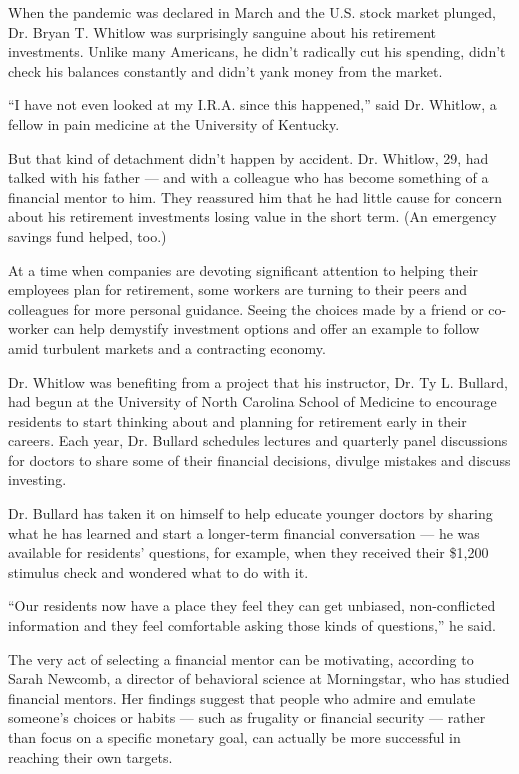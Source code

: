 When the pandemic was declared in March and the U.S. stock market
plunged, Dr. Bryan T. Whitlow was surprisingly sanguine about his
retirement investments. Unlike many Americans, he didn't radically cut
his spending, didn't check his balances constantly and didn't yank money
from the market.

``I have not even looked at my I.R.A. since this happened,'' said Dr.
Whitlow, a fellow in pain medicine at the University of Kentucky.

But that kind of detachment didn't happen by accident. Dr. Whitlow, 29,
had talked with his father --- and with a colleague who has become
something of a financial mentor to him. They reassured him that he had
little cause for concern about his retirement investments losing value
in the short term. (An emergency savings fund helped, too.)

At a time when companies are devoting significant attention to helping
their employees plan for retirement, some workers are turning to their
peers and colleagues for more personal guidance. Seeing the choices made
by a friend or co-worker can help demystify investment options and offer
an example to follow amid turbulent markets and a contracting economy.

Dr. Whitlow was benefiting from a project that his instructor, Dr. Ty L.
Bullard, had begun at the University of North Carolina School of
Medicine to encourage residents to start thinking about and planning for
retirement early in their careers. Each year, Dr. Bullard schedules
lectures and quarterly panel discussions for doctors to share some of
their financial decisions, divulge mistakes and discuss investing.

Dr. Bullard has taken it on himself to help educate younger doctors by
sharing what he has learned and start a longer-term financial
conversation --- he was available for residents' questions, for example,
when they received their \$1,200 stimulus check and wondered what to do
with it.

``Our residents now have a place they feel they can get unbiased,
non-conflicted information and they feel comfortable asking those kinds
of questions,'' he said.

The very act of selecting a financial mentor can be motivating,
according to Sarah Newcomb, a director of behavioral science at
Morningstar, who has studied financial mentors. Her findings suggest
that people who admire and emulate someone's choices or habits --- such
as frugality or financial security --- rather than focus on a specific
monetary goal, can actually be more successful in reaching their own
targets.


